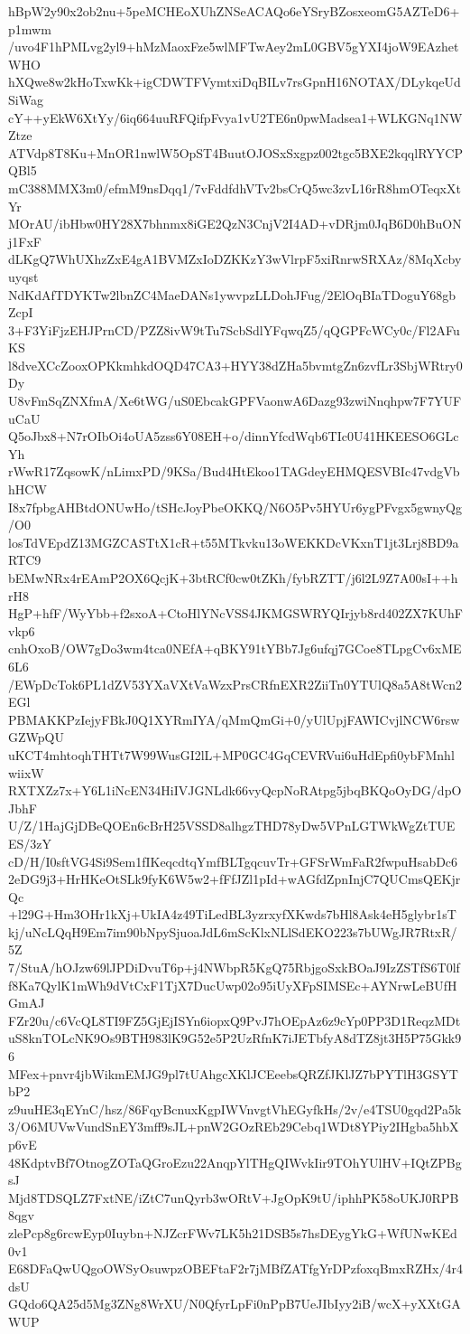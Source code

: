 hBpW2y90x2ob2nu+5peMCHEoXUhZNSeACAQo6eYSryBZosxeomG5AZTeD6+p1mwm
/uvo4F1hPMLvg2yl9+hMzMaoxFze5wlMFTwAey2mL0GBV5gYXI4joW9EAzhetWHO
hXQwe8w2kHoTxwKk+igCDWTFVymtxiDqBILv7rsGpnH16NOTAX/DLykqeUdSiWag
cY++yEkW6XtYy/6iq664uuRFQifpFvya1vU2TE6n0pwMadsea1+WLKGNq1NWZtze
ATVdp8T8Ku+MnOR1nwlW5OpST4BuutOJOSxSxgpz002tgc5BXE2kqqlRYYCPQBl5
mC388MMX3m0/efmM9nsDqq1/7vFddfdhVTv2bsCrQ5wc3zvL16rR8hmOTeqxXtYr
MOrAU/ibHbw0HY28X7bhnmx8iGE2QzN3CnjV2I4AD+vDRjm0JqB6D0hBuONj1FxF
dLKgQ7WhUXhzZxE4gA1BVMZxIoDZKKzY3wVlrpF5xiRnrwSRXAz/8MqXcbyuyqst
NdKdAfTDYKTw2lbnZC4MaeDANs1ywvpzLLDohJFug/2ElOqBIaTDoguY68gbZcpI
3+F3YiFjzEHJPrnCD/PZZ8ivW9tTu7ScbSdlYFqwqZ5/qQGPFcWCy0c/Fl2AFuKS
l8dveXCcZooxOPKkmhkdOQD47CA3+HYY38dZHa5bvmtgZn6zvfLr3SbjWRtry0Dy
U8vFmSqZNXfmA/Xe6tWG/uS0EbcakGPFVaonwA6Dazg93zwiNnqhpw7F7YUFuCaU
Q5oJbx8+N7rOIbOi4oUA5zss6Y08EH+o/dinnYfcdWqb6TIc0U41HKEESO6GLcYh
rWwR17ZqsowK/nLimxPD/9KSa/Bud4HtEkoo1TAGdeyEHMQESVBIc47vdgVbhHCW
I8x7fpbgAHBtdONUwHo/tSHcJoyPbeOKKQ/N6O5Pv5HYUr6ygPFvgx5gwnyQg/O0
losTdVEpdZ13MGZCASTtX1cR+t55MTkvku13oWEKKDcVKxnT1jt3Lrj8BD9aRTC9
bEMwNRx4rEAmP2OX6QcjK+3btRCf0cw0tZKh/fybRZTT/j6l2L9Z7A00sI++hrH8
HgP+hfF/WyYbb+f2sxoA+CtoHlYNcVSS4JKMGSWRYQIrjyb8rd402ZX7KUhFvkp6
cnhOxoB/OW7gDo3wm4tca0NEfA+qBKY91tYBb7Jg6ufqj7GCoe8TLpgCv6xME6L6
/EWpDcTok6PL1dZV53YXaVXtVaWzxPrsCRfnEXR2ZiiTn0YTUlQ8a5A8tWcn2EGl
PBMAKKPzIejyFBkJ0Q1XYRmIYA/qMmQmGi+0/yUlUpjFAWICvjlNCW6rswGZWpQU
uKCT4mhtoqhTHTt7W99WusGI2lL+MP0GC4GqCEVRVui6uHdEpfi0ybFMnhlwiixW
RXTXZz7x+Y6L1iNcEN34HiIVJGNLdk66vyQcpNoRAtpg5jbqBKQoOyDG/dpOJbhF
U/Z/1HajGjDBeQOEn6cBrH25VSSD8alhgzTHD78yDw5VPnLGTWkWgZtTUEES/3zY
cD/H/I0sftVG4Si9Sem1fIKeqcdtqYmfBLTgqcuvTr+GFSrWmFaR2fwpuHsabDc6
2eDG9j3+HrHKeOtSLk9fyK6W5w2+fFfJZl1pId+wAGfdZpnInjC7QUCmsQEKjrQc
+l29G+Hm3OHr1kXj+UkIA4z49TiLedBL3yzrxyfXKwds7bHl8Ask4eH5glybr1sT
kj/uNcLQqH9Em7im90bNpySjuoaJdL6mScKlxNLlSdEKO223s7bUWgJR7RtxR/5Z
7/StuA/hOJzw69lJPDiDvuT6p+j4NWbpR5KgQ75RbjgoSxkBOaJ9IzZSTfS6T0lf
f8Ka7QylK1mWh9dVtCxF1TjX7DucUwp02o95iUyXFpSIMSEc+AYNrwLeBUfHGmAJ
FZr20u/c6VcQL8TI9FZ5GjEjISYn6iopxQ9PvJ7hOEpAz6z9cYp0PP3D1ReqzMDt
uS8knTOLcNK9Os9BTH983lK9G52e5P2UzRfnK7iJETbfyA8dTZ8jt3H5P75Gkk96
MFex+pnvr4jbWikmEMJG9pl7tUAhgcXKlJCEeebsQRZfJKlJZ7bPYTlH3GSYTbP2
z9uuHE3qEYnC/hsz/86FqyBcnuxKgpIWVnvgtVhEGyfkHs/2v/e4TSU0gqd2Pa5k
3/O6MUVwVundSnEY3mff9sJL+pnW2GOzREb29Cebq1WDt8YPiy2IHgba5hbXp6vE
48KdptvBf7OtnogZOTaQGroEzu22AnqpYlTHgQIWvkIir9TOhYUlHV+IQtZPBgsJ
Mjd8TDSQLZ7FxtNE/iZtC7unQyrb3wORtV+JgOpK9tU/iphhPK58oUKJ0RPB8qgv
zlePcp8g6rcwEyp0Iuybn+NJZcrFWv7LK5h21DSB5s7hsDEygYkG+WfUNwKEd0v1
E68DFaQwUQgoOWSyOsuwpzOBEFtaF2r7jMBfZATfgYrDPzfoxqBmxRZHx/4r4dsU
GQdo6QA25d5Mg3ZNg8WrXU/N0QfyrLpFi0nPpB7UeJIbIyy2iB/wcX+yXXtGAWUP
